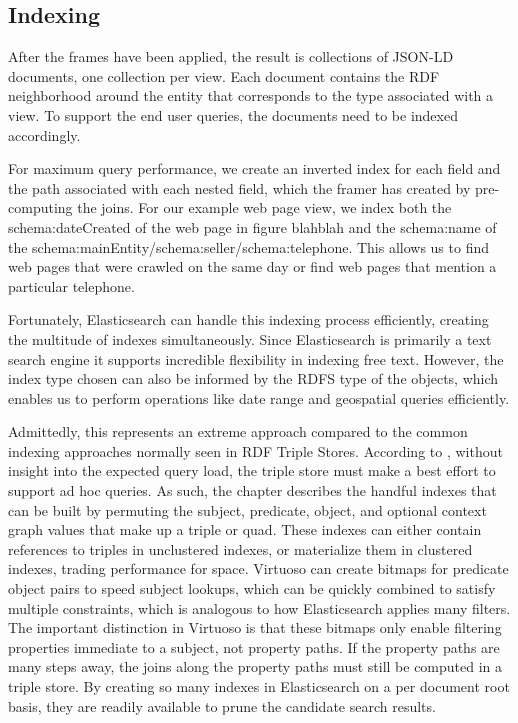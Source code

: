 \subsection{Indexing}
After the frames have been applied, the result is collections of JSON-LD documents, one collection per view.  
Each document contains the RDF neighborhood around the entity that corresponds to the type associated with a view.  
To support the end user queries, the documents need to be indexed accordingly.  

For maximum query performance, we create an inverted index for each field and the path associated with each nested field, which the framer has created by pre-computing the joins.  
For our example web page view,  we index both the schema:dateCreated of the web page in figure blahblah and the schema:name of the schema:mainEntity/schema:seller/schema:telephone.  
This allows us to find web pages that were crawled on the same day or find web pages that mention a particular telephone.  

Fortunately, Elasticsearch can handle this indexing process efficiently, creating the multitude of indexes simultaneously.  
Since Elasticsearch is primarily a text search engine it supports incredible flexibility in indexing free text.  
However, the index type chosen can also be informed by the RDFS type of the objects, which enables us to perform operations like date range and geospatial queries efficiently.

Admittedly, this represents an extreme approach compared to the common indexing approaches normally seen in RDF Triple Stores.  
According to \cite{luo2012storing}, without insight into the expected query load, the triple store must make a best effort to support ad hoc queries.  
As such, the chapter describes the handful indexes that can be built by permuting the subject, predicate, object, and optional context graph values that make up a triple or quad.
These indexes can either contain references to triples in unclustered indexes, or materialize them in clustered indexes, trading performance for space.
Virtuoso can create bitmaps for predicate object pairs to speed subject lookups, which can be quickly combined to satisfy multiple constraints, which is analogous to how Elasticsearch applies many filters. 
The important distinction in Virtuoso is that these bitmaps only enable filtering properties immediate to a subject, not property paths.
If the property paths are many steps away, the joins along the property paths must still be computed in a triple store.
By creating so many indexes in Elasticsearch on a per document root basis, they are readily available to prune the candidate search results.



 